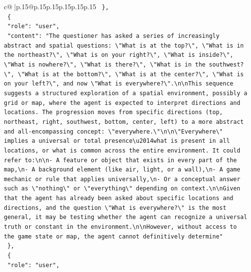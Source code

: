 \documentclass{article}
\begin{document}
{\begin{supertabular}{c@{$\;$}|p{.15\linewidth}@{}p{.15\linewidth}p{.15\linewidth}p{.15\linewidth}p{.15\linewidth}p{.15\linewidth}}
{{{\texttt{  \},} \\
\texttt{  \{} \\
\texttt{    "role": "user",} \\
\texttt{    "content": "The questioner has asked a series of increasingly abstract and spatial questions: \textbackslash{}"What is at the top?\textbackslash{}", \textbackslash{}"What is in the northeast?\textbackslash{}", \textbackslash{}"What is on your right?\textbackslash{}", \textbackslash{}"What is inside?\textbackslash{}", \textbackslash{}"What is nowhere?\textbackslash{}", \textbackslash{}"What is there?\textbackslash{}", \textbackslash{}"What is in the southwest?\textbackslash{}", \textbackslash{}"What is at the bottom?\textbackslash{}", \textbackslash{}"What is at the center?\textbackslash{}", \textbackslash{}"What is on your left?\textbackslash{}", and now \textbackslash{}"What is everywhere?\textbackslash{}".\textbackslash{}n\textbackslash{}nThis sequence suggests a structured exploration of a spatial environment, possibly a grid or map, where the agent is expected to interpret directions and locations. The progression moves from specific directions (top, northeast, right, southwest, bottom, center, left) to a more abstract and all{-}encompassing concept: \textbackslash{}"everywhere.\textbackslash{}"\textbackslash{}n\textbackslash{}n\textbackslash{}"Everywhere\textbackslash{}" implies a universal or total presence\textbackslash{}u2014what is present in all locations, or what is common across the entire environment. It could refer to:\textbackslash{}n\textbackslash{}n{-} A feature or object that exists in every part of the map,\textbackslash{}n{-} A background element (like air, light, or a wall),\textbackslash{}n{-} A game mechanic or rule that applies universally,\textbackslash{}n{-} Or a conceptual answer such as \textbackslash{}"nothing\textbackslash{}" or \textbackslash{}"everything\textbackslash{}" depending on context.\textbackslash{}n\textbackslash{}nGiven that the agent has already been asked about specific locations and directions, and the question \textbackslash{}"What is everywhere?\textbackslash{}" is the most general, it may be testing whether the agent can recognize a universal truth or constant in the environment.\textbackslash{}n\textbackslash{}nHowever, without access to the game state or map, the agent cannot definitively determine"} \\
\texttt{  \},} \\
\texttt{  \{} \\
\texttt{    "role": "user",} \\
}}}
\end{supertabular}}
\end{document}
